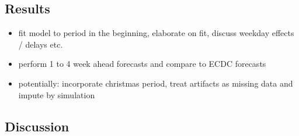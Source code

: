 \subsection{Results}

\begin{itemize}
    \item fit model to period in the beginning, elaborate on fit, discuss weekday effects / delays etc.
    \item perform 1 to 4 week ahead forecasts and compare to ECDC forecasts
    \item potentially: incorporate christmas period, treat artifacts as missing data and impute by simulation
\end{itemize}

\subsection{Discussion}
